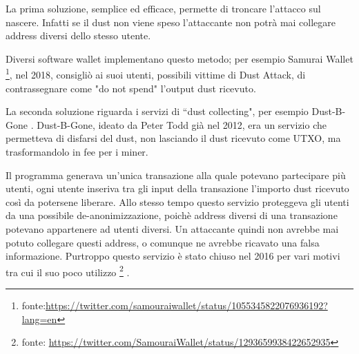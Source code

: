 La prima soluzione, semplice ed efficace, permette di troncare l'attacco sul nascere. Infatti se il dust non viene speso l'attaccante non potrà mai collegare address diversi dello stesso utente. 

Diversi software wallet implementano questo metodo; per esempio Samurai Wallet \footnote{fonte:\url{https://twitter.com/samouraiwallet/status/1055345822076936192?lang=en}}, nel 2018, consigliò ai suoi utenti, possibili vittime di Dust Attack,  di contrassegnare come "do not spend" l'output dust ricevuto.

La seconda soluzione riguarda i servizi di ``dust collecting", per esempio Dust-B-Gone \cite{Dbg}.
Dust-B-Gone, ideato da Peter Todd già nel 2012, era un servizio che permetteva di disfarsi del dust, non lasciando il dust ricevuto come UTXO, ma trasformandolo in fee per i miner.

Il programma generava un'unica transazione alla quale potevano partecipare più utenti, ogni utente inseriva tra gli input della transazione l'importo dust ricevuto così da potersene liberare. Allo stesso tempo questo servizio proteggeva gli utenti da una possibile de-anonimizzazione, poichè address diversi di una transazione potevano appartenere ad utenti diversi. Un attaccante quindi non avrebbe mai potuto collegare questi address, o comunque ne avrebbe ricavato una falsa informazione.
Purtroppo questo servizio è stato chiuso nel 2016 per vari motivi tra cui il suo poco utilizzo \footnote{fonte: \url{https://twitter.com/SamouraiWallet/status/1293659938422652935}} . 